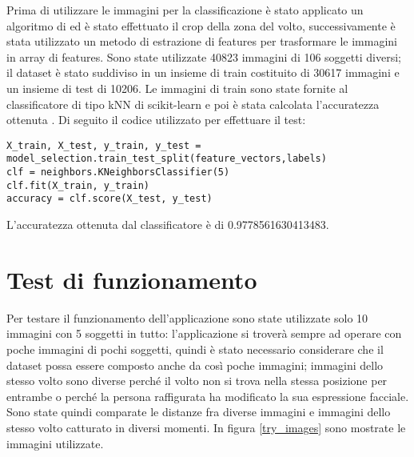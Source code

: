Prima di utilizzare le immagini per la classificazione è stato applicato un algoritmo di  ed è stato effettuato il crop della zona del volto, successivamente è stata utilizzato un metodo di estrazione di features per trasformare le immagini in array di features. Sono state utilizzate 40823 immagini di 106 soggetti diversi; il dataset è stato suddiviso in un insieme di train costituito di 30617 immagini e un insieme di test di 10206. Le immagini di train sono state fornite al classificatore di tipo kNN di scikit-learn e poi è stata calcolata l'accuratezza ottenuta \cite{scikit-learn}. Di seguito il codice utilizzato per effettuare il test:

\begin{lstlisting}
X_train, X_test, y_train, y_test = 
model_selection.train_test_split(feature_vectors,labels)                       
clf = neighbors.KNeighborsClassifier(5)
clf.fit(X_train, y_train)
accuracy = clf.score(X_test, y_test)
\end{lstlisting}
L'accuratezza ottenuta dal classificatore è di 0.9778561630413483.


\section{Test di funzionamento}

Per testare il funzionamento dell'applicazione sono state utilizzate solo 10 immagini con 5 soggetti in tutto: l'applicazione si troverà sempre ad operare con poche immagini di pochi soggetti, quindi è stato necessario considerare che il dataset possa essere composto anche da così poche immagini; immagini dello stesso volto sono diverse perché il volto non si trova nella stessa posizione per entrambe o perché la persona raffigurata ha modificato la sua espressione facciale. Sono state quindi comparate le distanze fra diverse immagini e immagini dello stesso volto catturato in diversi momenti. In figura \ref{try_images} sono mostrate le immagini utilizzate. 

